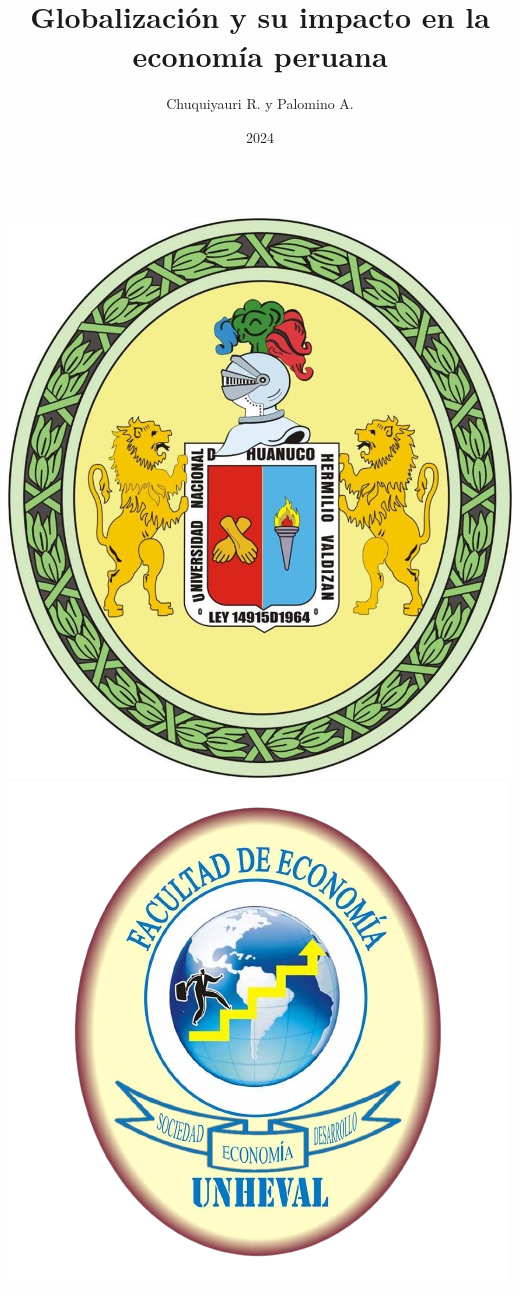 \documentclass[aspectratio=169]{beamer}
\title{Globalización y su impacto en la economía peruana}
\author{Chuquiyauri R. y Palomino A.}
\institute{Universidad Nacional Hermilio Valdizan \\ Facultad de Economía}
\date{2024}
\begin{document}
\begin{frame}
    \begin{columns}
            \includegraphics[width=\textwidth]{./images/unheval.jpg} %
            \titlepage    
            \includegraphics[width=\textwidth]{./images/economia.png} %
    \end{columns}
\end{frame}
\end{document}
